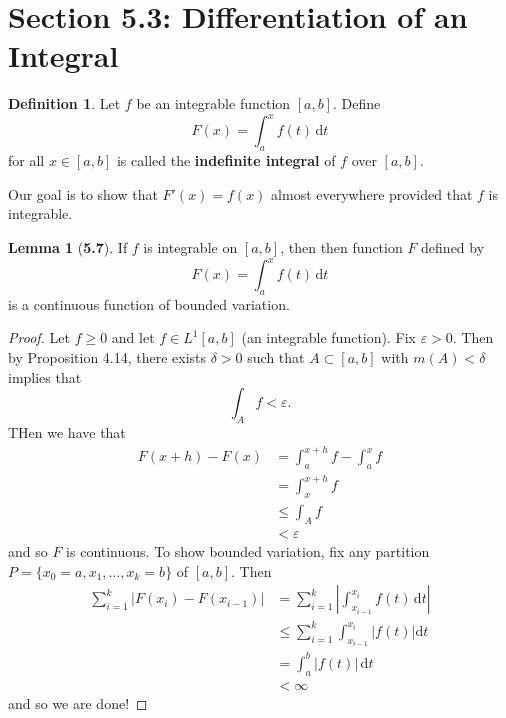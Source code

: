 \documentclass[12pt]{article}
\renewcommand{\epsilon}{\varepsilon}
\theoremstyle{definition}
\newtheorem*{definition}{Definition}
\newtheorem*{lemma}{Lemma}
\begin{document}
\section*{Section 5.3: Differentiation of an Integral}

\begin{definition}
    Let \( f \) be an integrable function \( [a, b] \). Define
        \[
            F(x) = \int_{a}^{x} f(t) \, \mathrm{d}t  
        \]
    for all \( x \in [a,b] \) is called the \textbf{indefinite integral} of \( f \) over \( [a,b] \).
\end{definition}

Our goal is to show that \( F'(x) = f(x) \) almost everywhere provided that \( f \) is integrable. 

\begin{lemma}[\textbf{5.7}]

    If \( f \) is integrable on \( [a, b] \), then then function \( F \) defined by
        \[
            F(x) = \int_{a}^{x} f(t) \, \mathrm{d}t  
        \]
    is a continuous function of bounded variation. 

        \begin{proof}
            Let \( f \geq 0 \) and let \( f \in L^{1}[a,b] \) (an integrable function). Fix \( \epsilon > 0 \). Then by Proposition 4.14, there exists \( \delta > 0 \) such that \( A \subset [a,b] \) with \( m(A) < \delta \) implies that
                \[
                    \int_{A} f < \epsilon.
                \]
            THen we have that 
                \begin{align*}
                    F(x + h) - F(x) &= \int_{a}^{x+h}f - \int_{a}^{x} f \\ 
                    &= \int_{x}^{x + h} f \\
                    &\leq \int_{A} f \\
                    &< \epsilon
                \end{align*}
            and so \( F \) is continuous. To show bounded variation, fix any partition \( P = \{x_0 = a, x_1, \ldots, x_k = b \} \) of \( [a,b] \).
            Then 
                \begin{align*}
                    \sum_{i=1}^{k}\left| F(x_i) - F(x_{i-1}) \right| &= \sum_{i=1}^{k} \left| \int_{x_{i-1}}^{x_{i}} f(t) \, \mathrm{d} t\right| \\
                    &\leq \sum_{i=1}^{k} \int_{x_{i-1}}^{x_{i}} \left| f(t) \right| \mathrm{d}t  \\
                    &= \int_{a}^{b} |f(t)| \, \mathrm{d}t \\
                    &< \infty
                \end{align*}
            and so we are done!
        \end{proof}
\end{lemma}
\end{document}
